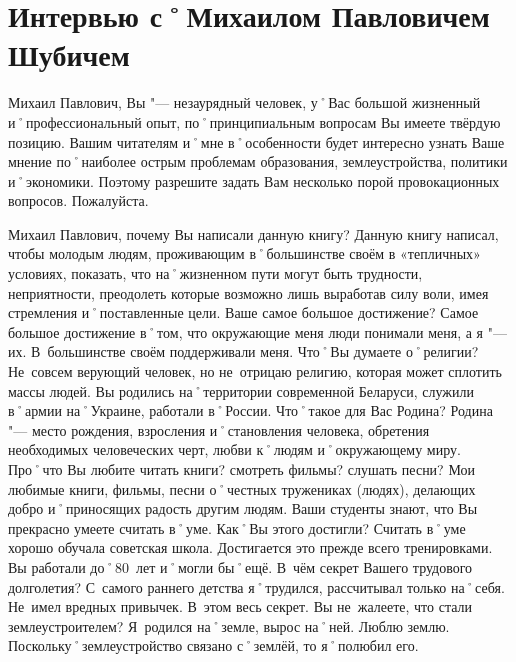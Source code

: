 ﻿\chapter[Интервью с М.\,П.~Шубичем]{Интервью с˚Михаилом Павловичем Шубичем}

\begin{drama}
	\setlength{\speaksindent}{5em}
	\setlength{\Dlabelsep}{5em}
	
	\maxspeaks Михаил Павлович, Вы "--- незаурядный человек, у˚Вас большой жизненный и˚профессиональный опыт, по˚принципиальным вопросам Вы имеете твёрдую позицию. Вашим читателям и˚мне в˚особенности будет интересно узнать Ваше мнение по˚наиболее острым проблемам образования, землеустройства, политики и˚экономики. Поэтому разрешите задать Вам несколько порой провокационных вопросов.
	\michaelspeaks Пожалуйста.
	
	\maxspeaks Михаил Павлович, почему Вы написали данную книгу?
	\michaelspeaks Данную книгу написал, чтобы молодым людям, проживающим в˚большинстве своём в «тепличных» условиях, показать, что на˚жизненном пути могут быть трудности, неприятности, преодолеть которые возможно лишь выработав силу воли, имея стремления и˚поставленные цели.
	\maxspeaks Ваше самое большое достижение?
	\michaelspeaks Самое большое достижение в˚том, что окружающие меня люди понимали меня, а я "--- их. В~большинстве своём поддерживали меня.
	\maxspeaks Что˚Вы думаете о˚религии? 
	\michaelspeaks Не~совсем верующий человек, но не~отрицаю религию, которая может сплотить массы людей.
	\maxspeaks Вы родились на˚территории современной Беларуси, служили в˚армии на˚Украине, работали в˚России. Что˚такое для Вас Родина?
	\michaelspeaks Родина "--- место рождения, взросления и˚становления человека, обретения необходимых человеческих черт, любви к˚людям и˚окружающему миру.
	\maxspeaks Про˚что Вы любите читать книги? смотреть фильмы? слушать песни?
	\michaelspeaks Мои любимые книги, фильмы, песни о˚честных тружениках (людях), делающих добро и˚приносящих радость другим людям.
	\maxspeaks Ваши студенты знают, что Вы прекрасно умеете считать в˚уме. Как˚Вы этого достигли?
	\michaelspeaks Считать в˚уме хорошо обучала советская школа. Достигается это прежде всего тренировками.
	\maxspeaks Вы работали до˚80~лет и˚могли бы˚ещё. В~чём секрет Вашего трудового долголетия?
	\michaelspeaks С~самого раннего детства я˚трудился, рассчитывал только на˚себя. Не~имел вредных привычек. В~этом весь секрет. 
	\maxspeaks Вы не~жалеете, что стали землеустроителем?
	\michaelspeaks Я~родился на˚земле, вырос на˚ней. Люблю землю. Поскольку˚землеустройство связано с˚землёй, то я˚полюбил его.


\end{drama}
